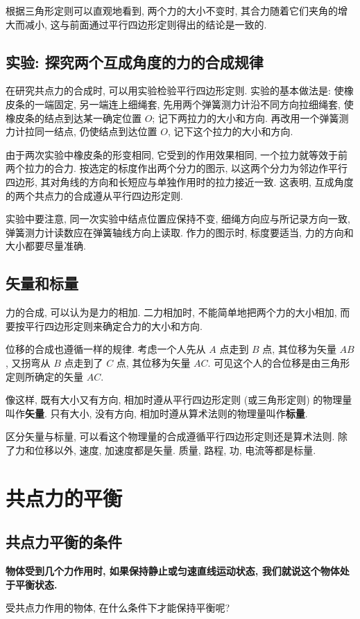 \documentclass[UTF8,openany,fontset=fandol]{ctexbook}
\theoremstyle{chinesetextbook}
\begin{document}
根据三角形定则可以直观地看到, 两个力的大小不变时, 其合力随着它们夹角的增大而减小, 这与前面通过平行四边形定则得出的结论是一致的.
\subsection{实验: 探究两个互成角度的力的合成规律}
在研究共点力的合成时, 可以用实验检验平行四边形定则. 实验的基本做法是: 使橡皮条的一端固定, 另一端连上细绳套, 先用两个弹簧测力计沿不同方向拉细绳套, 使橡皮条的结点到达某一确定位置 $O$; 记下两拉力的大小和方向. 再改用一个弹簧测力计拉同一结点, 仍使结点到达位置 $O$, 记下这个拉力的大小和方向.

由于两次实验中橡皮条的形变相同, 它受到的作用效果相同, 一个拉力就等效于前两个拉力的合力. 按选定的标度作出两个分力的图示, 以这两个分力为邻边作平行四边形, 其对角线的方向和长短应与单独作用时的拉力接近一致. 这表明, 互成角度的两个共点力的合成遵从平行四边形定则.

实验中要注意, 同一次实验中结点位置应保持不变, 细绳方向应与所记录方向一致, 弹簧测力计读数应在弹簧轴线方向上读取. 作力的图示时, 标度要适当, 力的方向和大小都要尽量准确.
\subsection{矢量和标量}
力的合成, 可以认为是力的相加. 二力相加时, 不能简单地把两个力的大小相加, 而要按平行四边形定则来确定合力的大小和方向.

位移的合成也遵循一样的规律. 考虑一个人先从 $A$ 点走到 $B$ 点, 其位移为矢量 $AB$, 又拐弯从 $B$ 点走到了 $C$ 点, 其位移为矢量 $AC$. 可见这个人的合位移是由三角形定则所确定的矢量 $AC$.

像这样, 既有大小又有方向, 相加时遵从平行四边形定则 (或三角形定则) 的物理量叫作\textbf{矢量}. 只有大小, 没有方向, 相加时遵从算术法则的物理量叫作\textbf{标量}.

区分矢量与标量, 可以看这个物理量的合成遵循平行四边形定则还是算术法则. 除了力和位移以外, 速度, 加速度都是矢量. 质量, 路程, 功, 电流等都是标量.
\section{共点力的平衡}
\subsection{共点力平衡的条件}
\textbf{物体受到几个力作用时, 如果保持静止或匀速直线运动状态, 我们就说这个物体处于平衡状态.}

受共点力作用的物体, 在什么条件下才能保持平衡呢?
\end{document}

